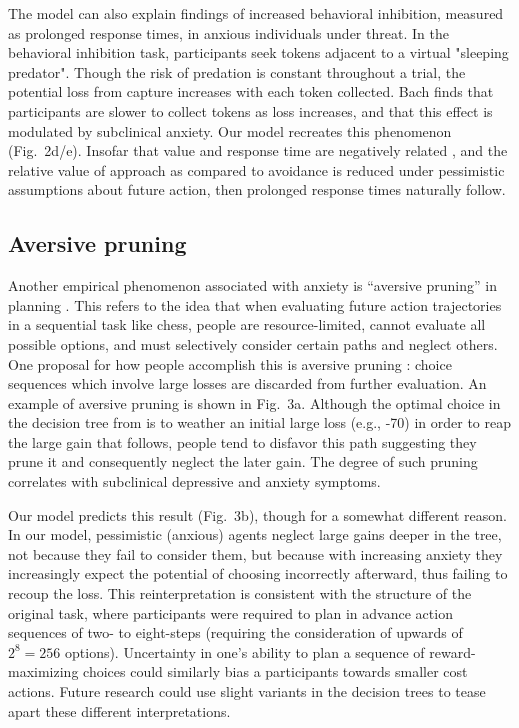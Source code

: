 \documentclass[11pt]{article} %
\begin{document}
The model can also explain findings of increased behavioral inhibition, measured as prolonged response times, in anxious individuals under threat\cite{bach2015}. In the behavioral inhibition task, participants seek tokens adjacent to a virtual "sleeping predator". Though the risk of predation is constant throughout a trial, the potential loss from capture increases with each token collected. Bach \cite{bach2015} finds that participants are slower to collect tokens as loss increases, and that this effect is modulated by subclinical anxiety. Our model recreates this phenomenon (Fig.~2d/e). Insofar that value and response time are negatively related \citep{need citation?}, and the relative value of approach as compared to avoidance is reduced under pessimistic assumptions about future action, then prolonged response times naturally follow. 

\subsection{Aversive pruning} 

Another empirical phenomenon associated with anxiety is ``aversive pruning'' in planning \cite{Huys2012, Lally2017}. This refers to the idea that when evaluating future action trajectories in a sequential task like chess, people are resource-limited, cannot evaluate all possible options, and must selectively consider certain paths and neglect others. One proposal for how people accomplish this is aversive pruning \citep{Huys2012}: choice sequences which involve large losses are discarded from further evaluation. An example of aversive pruning is shown in Fig.~3a. Although the optimal choice in the decision tree from is to weather an initial large loss (e.g., -70) in order to reap the large gain that follows, people tend to disfavor this path suggesting they prune it and consequently neglect the later gain. The degree of such pruning correlates with subclinical depressive \cite{Huys2012} and anxiety \cite{Lally2017} symptoms. 

Our model predicts this result (Fig.~3b), though for a somewhat different reason. In our model, pessimistic (anxious) agents neglect large gains deeper in the tree, not because they fail to consider them, but because with increasing anxiety they increasingly expect the potential of choosing incorrectly afterward, thus failing to recoup the loss. This reinterpretation is consistent with the structure of the original task\citep{Huys2012, Lally2017}, where participants were required to plan in advance action sequences of two- to eight-steps (requiring the consideration of upwards of $2^8 = 256$ options). Uncertainty in one's ability to plan a sequence of reward-maximizing choices could similarly bias a participants towards smaller cost actions. Future research could use slight variants in the decision trees to tease apart these different interpretations.
\end{document}
